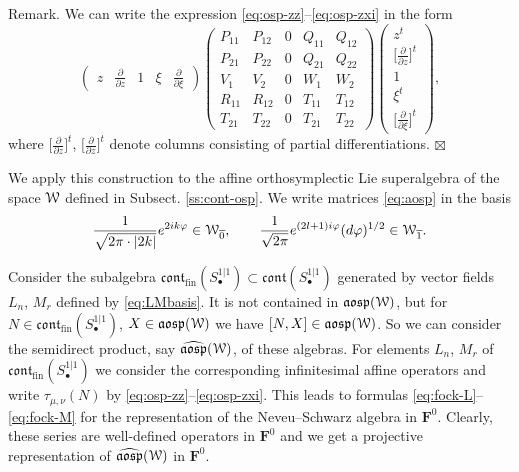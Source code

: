 \documentclass[]{amsart}
\newcounter{sec}
\def\phi{\varphi}
\def\cW{\EuScript W}
\def\ov{\overline}
\def\wh{\widehat}
\def\F{\mathbf F}
\def\sm{\smallskip}
\def\0{{\ov 0}}
\def\1{{\ov 1}}
\def\cont{\mathfrak{cont}}
\begin{document}
\sm

{\sm Remark.}
We  can write the expression \eqref{eq:osp-zz}--\eqref{eq:osp-zxi}
in the form 
$$
\begin{pmatrix}
	z&\frac{\partial}{\partial z}&1&\xi&\frac{\partial}{\partial \xi}
\end{pmatrix}
\left(
\begin{array}{ccc|cc}
	P_{11}&P_{12}&0&Q_{11}&Q_{12}\\
	P_{21}&P_{22}&0&Q_{21}&Q_{22}\\
	V_1&V_2&0&W_1&W_2\\
	\hline
	R_{11}&R_{12}&0&T_{11}&T_{12}\\
	T_{21}&T_{22}&0&T_{21}&T_{22}
\end{array}\right)
\begin{pmatrix}
	z^t\\ \bigl[\frac{\partial}{\partial z}\bigr]^t\\1\\ \xi^t\\ \bigl[\frac{\partial}{\partial \xi}\bigr]^t
\end{pmatrix},
$$
where $\bigl[\frac{\partial}{\partial z}\bigr]^t$, 
$\bigl[\frac{\partial}{\partial z}\bigr]^t$
denote columns consisting of partial differentiations.
\hfill $\boxtimes$

\sm

We apply this construction to the affine orthosymplectic Lie superalgebra
of the space $\cW$
defined in Subsect. \ref{ss:cont-osp}. We write matrices
\eqref{eq:aosp} in the basis 
$$\frac 1{\sqrt{2\pi\cdot |2k|}}e^{2ik\phi}\in \cW_\0,\qquad
\frac 1{\sqrt{2\pi}}
e^{(2l+1)i\phi}(d\phi)^{1/2}\in \cW_\1.$$ 

Consider the subalgebra   
$\cont_{\mathrm{fin}}(S^{1|1}_\bullet)\subset \cont(S^{1|1}_\bullet)$
generated by vector fields $L_n$, $M_r$
defined by \eqref{eq:LMbasis}.
It is not contained in $\mathfrak{aosp}(\cW)$, but 
for $N\in \cont_{\mathrm{fin}}(S^{1|1}_\bullet)$,
$X\in \mathfrak{aosp}(\cW)$ we have $[N,X]\in \mathfrak{aosp}(\cW)$.
So we can consider the semidirect product, say 
$\wh{\mathfrak{aosp}}(\cW)$, of these 
algebras. For  elements $L_n$, $M_r$ of 
$\cont_{\mathrm{fin}}(S^{1|1}_\bullet)$ we consider the corresponding
infinitesimal
affine  operators 
and write
$\tau_{\mu,\nu}(N)$ by
\eqref{eq:osp-zz}--\eqref{eq:osp-zxi}.
This leads to formulas \eqref{eq:fock-L}--\eqref{eq:fock-M}
for the representation of the Neveu--Schwarz algebra
in $\F^0$. Clearly, these series are well-defined
operators in $\F^0$ and we get a projective representation
of $\wh{\mathfrak{aosp}}(\cW)$ in  $\F^0$.
\end{document}
